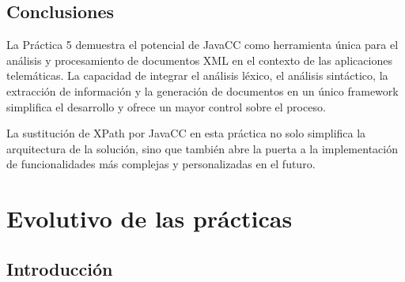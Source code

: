 \subsection{Conclusiones}

\noindent La Práctica 5 demuestra el potencial de JavaCC como herramienta única para el análisis y procesamiento de documentos XML en el contexto de las aplicaciones telemáticas. La capacidad de integrar el análisis léxico, el análisis sintáctico, la extracción de información y la generación de documentos en un único framework simplifica el desarrollo y ofrece un mayor control sobre el proceso. 



La sustitución de XPath por JavaCC en esta práctica no solo simplifica la arquitectura de la solución, sino que también abre la puerta a la implementación de funcionalidades más complejas y personalizadas en el futuro.

\section{Evolutivo de las prácticas}

\subsection{Introducción}



